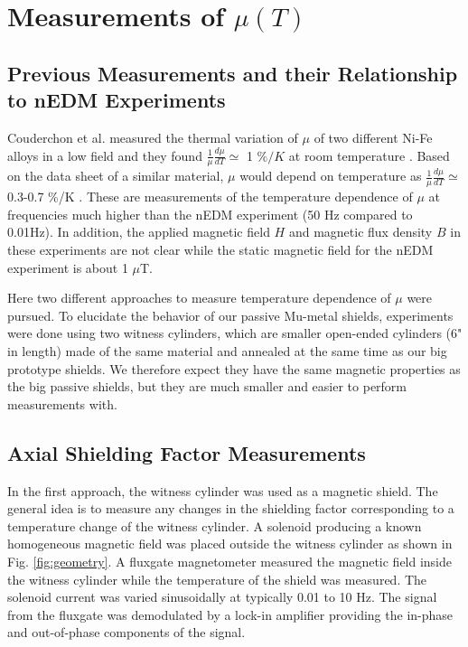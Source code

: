 \documentclass[review]{elsarticle}
\begin{document}
\section{Measurements of $\mu(T)$}

\subsection{Previous Measurements and their Relationship to nEDM Experiments}
Couderchon et al. measured the thermal variation of $\mu$ of two different Ni-Fe alloys in a low field and they found $\frac{1}{\mu}\frac{d \mu}{dT}\simeq$ 1 $\%/K$ at room temperature \cite{bib:couderchon}. Based on the data sheet of a similar material, $\mu$ would depend on temperature as $\frac{1}{\mu} \frac{d \mu}{dT} \simeq $ 0.3-0.7 \%/K \cite{bib:kruppvdm}. These are measurements of the temperature dependence of $\mu$ at frequencies much higher than the nEDM experiment (50 Hz compared to 0.01Hz). In addition, the applied magnetic field $H$ and magnetic flux density $B$ in these experiments are not clear while the static magnetic field for the nEDM experiment is about 1 $\mu$T.

Here two different approaches to measure temperature dependence of $\mu$ were pursued. To elucidate the behavior of our passive Mu-metal shields, experiments were done using two witness cylinders, which are smaller open-ended cylinders (6" in length) made of the same material and annealed at the same time as our big prototype shields. We therefore expect they have the same magnetic properties as the big passive shields, but they are much smaller and easier to perform measurements with.

\subsection{Axial Shielding Factor Measurements}
In the first approach, the witness cylinder was used as a magnetic shield. 
The general idea is to measure any changes in the shielding factor corresponding to a temperature change of the witness cylinder. 
A solenoid producing a known homogeneous magnetic field was placed outside the witness cylinder as shown in Fig. \ref{fig:geometry}.
A fluxgate magnetometer measured the magnetic field inside the witness cylinder while the temperature of the shield was measured.
The solenoid current was varied sinusoidally at typically 0.01 to 10 Hz.
The signal from the fluxgate was demodulated by a lock-in amplifier providing the in-phase and out-of-phase components of the signal.
\end{document}
